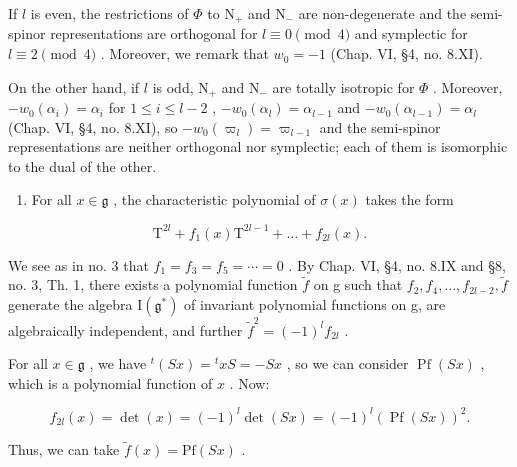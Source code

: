 If \(l\) is even, the restrictions of \(\varPhi\) to \(\mathrm{N}_{+}\) and \(\mathrm{N}_{-}\) are non-degenerate and the semi-spinor representations are orthogonal for \(l \equiv 0 \pmod{4}\) and symplectic for \(l \equiv 2 \pmod{4}\) . Moreover, we remark that \(w_{0} = -1\) (Chap. VI, §4, no. 8.XI).

On the other hand, if \(l\) is odd, \(\mathrm{N}_{+}\) and \(\mathrm{N}_{-}\) are totally isotropic for \(\varPhi\) . Moreover, \(-w_{0}(\alpha_{i}) = \alpha_{i}\) for \(1 \leq i \leq l - 2\) , \(-w_{0}(\alpha_{l}) = \alpha_{l - 1}\) and \(-w_{0}(\alpha_{l - 1}) = \alpha_{l}\) (Chap. VI, §4, no. 8.XI), so \(-w_{0}(\varpi_{l}) = \varpi_{l - 1}\) and the semi-spinor representations are neither orthogonal nor symplectic; each of them is isomorphic to the dual of the other.

\begin{enumerate}
\def\labelenumi{(\Roman{enumi})}
\setcounter{enumi}{5}
\tightlist
\item
  For all \(x \in \mathfrak{g}\) , the characteristic polynomial of \(\sigma(x)\) takes the form
\end{enumerate}

\[
\mathrm{T} ^ {2 l} + f _ {1} (x) \mathrm{T} ^ {2 l - 1} + \dots + f _ {2 l} (x).
\]

We see as in no. 3 that \(f_{1}=f_{3}=f_{5}=\cdots=0\) . By Chap. VI, §4, no. 8.IX and §8, no. 3, Th. 1, there exists a polynomial function \(\tilde{f}\) on g such that \(f_{2}, f_{4}, \ldots, f_{2l-2}, \tilde{f}\) generate the algebra \(\mathrm{I}(\mathfrak{g}^{*})\) of invariant polynomial functions on g, are algebraically independent, and further \(\tilde{f}^{2}=(-1)^{l}f_{2l}\) .

For all \(x \in \mathfrak{g}\) , we have \({}^t(Sx) = {}^t xS = -Sx\) , so we can consider \(\operatorname{Pf}(Sx)\) , which is a polynomial function of \(x\) . Now:

\[
f _ {2 l} (x) = \det (x) = (- 1) ^ {l} \det (S x) = (- 1) ^ {l} (\operatorname{Pf} (S x)) ^ {2}.
\]

Thus, we can take \(\tilde{f}(x) = \mathrm{Pf}(Sx)\) .

